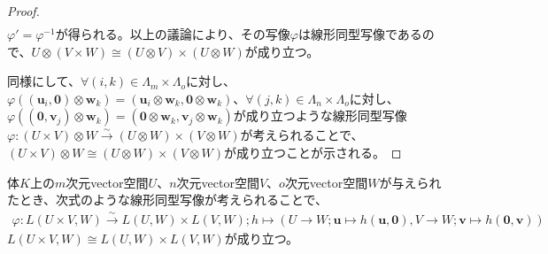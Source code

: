 \documentclass[dvipdfmx]{jsarticle}
\begin{document}
\begin{proof}
\begin{align*}
\end{align*}
$\varphi' = \varphi^{- 1}$が得られる。以上の議論により、その写像$\varphi$は線形同型写像であるので、$U \otimes (V \times W) \cong (U \otimes V) \times (U \otimes W)$が成り立つ。\par
同様にして、$\forall(i,k) \in \varLambda_{m} \times \varLambda_{o}$に対し、$\varphi\left( \left( \mathbf{u}_{i},\mathbf{0} \right) \otimes \mathbf{w}_{k} \right) = \left( \mathbf{u}_{i} \otimes \mathbf{w}_{k},\mathbf{0} \otimes \mathbf{w}_{k} \right)$、$\forall(j,k) \in \varLambda_{n} \times \varLambda_{o}$に対し、$\varphi\left( \left( \mathbf{0},\mathbf{v}_{j} \right) \otimes \mathbf{w}_{k} \right) = \left( \mathbf{0} \otimes \mathbf{w}_{k},\mathbf{v}_{j} \otimes \mathbf{w}_{k} \right)$が成り立つような線形同型写像$\varphi:(U \times V) \otimes W\overset{\sim}{\rightarrow}(U \otimes W) \times (V \otimes W)$が考えられることで、$(U \times V) \otimes W \cong (U \otimes W) \times (V \otimes W)$が成り立つことが示される。
\end{proof}
\begin{thm}\label{2.4.9.8}
体$K$上の$m$次元vector空間$U$、$n$次元vector空間$V$、$o$次元vector空間$W$が与えられたとき、次式のような線形同型写像が考えられることで、
\begin{align*}
\varphi:L(U \times V,W)\overset{\sim}{\rightarrow}L(U,W) \times L(V,W);h \mapsto \left( U \rightarrow W;\mathbf{u} \mapsto h\left( \mathbf{u},\mathbf{0} \right),V \rightarrow W;\mathbf{v} \mapsto h\left( \mathbf{0},\mathbf{v} \right) \right)
\end{align*}
$L(U \times V,W) \cong L(U,W) \times L(V,W)$が成り立つ。
\end{thm}
\end{document}

